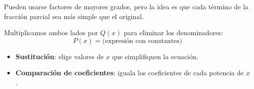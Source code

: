 Pueden usarse factores de mayores grados, pero la idea es que cada término de la fracción parcial sea más simple que el original.

Multiplicamos ambos lados por \(Q(x)\) para eliminar los denominadores:
\[
P(x) = \text{(expresión con constantes)}
\]

\begin{itemize}
    \item \textbf{Sustitución}: elige valores de \(x\) que simplifiquen la ecuación.
    \item \textbf{Comparación de coeficientes}: iguala los coeficientes de cada potencia de \(x\).
\end{itemize}